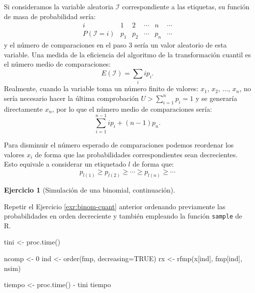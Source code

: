 \documentclass[
]{book}
\newenvironment{Shaded}{\begin{snugshade}}{\end{snugshade}}
\newcommand{\AttributeTok}[1]{\textcolor[rgb]{0.77,0.63,0.00}{#1}}
\newcommand{\ConstantTok}[1]{\textcolor[rgb]{0.00,0.00,0.00}{#1}}
\newcommand{\DecValTok}[1]{\textcolor[rgb]{0.00,0.00,0.81}{#1}}
\newcommand{\FunctionTok}[1]{\textcolor[rgb]{0.00,0.00,0.00}{#1}}
\newcommand{\NormalTok}[1]{#1}
\newcommand{\OtherTok}[1]{\textcolor[rgb]{0.56,0.35,0.01}{#1}}
\newcommand{\SpecialCharTok}[1]{\textcolor[rgb]{0.00,0.00,0.00}{#1}}
\theoremstyle{break}
\theoremstyle{definition}
\theoremstyle{definition}
\theoremstyle{definition}
\newtheorem{exercise}{Ejercicio}[chapter]
\theoremstyle{definition}
\theoremstyle{remark}
\begin{document}
Si consideramos la variable aleatoria \(\mathcal{I}\) correspondiente a las etiquetas, su función de masa de probabilidad sería:
\[\begin{array}{l|ccccc}
i & 1 & 2 & \cdots & n & \cdots \\ \hline
P\left( \mathcal{I}=i\right) & p_{1} & p_{2} & \cdots & p_{n} & \cdots 
\end{array}\]
y el número de comparaciones en el paso 3 sería un valor aleatorio de esta variable.
Una medida de la eficiencia del algoritmo de la transformación cuantil es
el número medio de comparaciones:
\[E\left( \mathcal{I}\right) =\sum_i ip_{i}.\]
Realmente, cuando la variable toma un número finito de valores:
\(x_{1}\), \(x_{2}\), \(\ldots\), \(x_{n}\), no sería necesario hacer
la última comprobación \(U>\sum_{i=1}^{n}p_{i}=1\) y se
generaría directamente \(x_{n}\), por lo que el
número medio de comparaciones sería:
\[\sum_{i=1}^{n-1}ip_{i}+\left( n-1\right)  p_{n}.\]

Para disminuir el número esperado de comparaciones podemos
reordenar los valores \(x_{i}\) de forma que las probabilidades
correspondientes sean decrecientes. Esto equivale a considerar
un etiquetado \(l\) de forma que:
\[p_{l\left( 1\right) }\geq p_{l\left( 2\right) }\geq \cdots \geq p_{l\left(
n\right) }\geq \cdots\]

\begin{exercise}[Simulación de una binomial, continuación]
\protect\hypertarget{exr:binom-cuantb}{}{\label{exr:binom-cuantb} {} }
\end{exercise}

Repetir el Ejercicio \ref{exr:binom-cuant} anterior ordenando previamente las
probabilidades en orden decreciente y también empleando la
función \texttt{sample} de R.

\begin{Shaded}
\begin{Highlighting}[]
\NormalTok{tini }\OtherTok{\textless{}{-}} \FunctionTok{proc.time}\NormalTok{()}

\NormalTok{ncomp }\OtherTok{\textless{}{-}} \DecValTok{0}
\NormalTok{ind }\OtherTok{\textless{}{-}} \FunctionTok{order}\NormalTok{(fmp, }\AttributeTok{decreasing=}\ConstantTok{TRUE}\NormalTok{)}
\NormalTok{rx }\OtherTok{\textless{}{-}} \FunctionTok{rfmp}\NormalTok{(x[ind], fmp[ind], nsim)}

\NormalTok{tiempo }\OtherTok{\textless{}{-}} \FunctionTok{proc.time}\NormalTok{() }\SpecialCharTok{{-}}\NormalTok{ tini}
\NormalTok{tiempo}
\end{Highlighting}
\end{Shaded}
\end{document}
